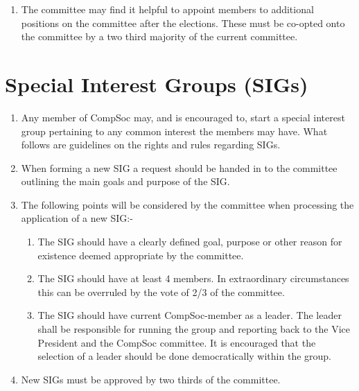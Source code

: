 \documentclass[a4paper]{article}
\begin{document}
\begin {enumerate}
    \item The committee may find it helpful to appoint members to additional positions
      on the committee after the elections. These must be co-opted onto the committee by a two
      third majority of the current committee.

\end{enumerate}


\newpage{}
\section{Special Interest Groups (SIGs)}

\begin{enumerate}

  \item Any member of CompSoc may, and is encouraged to, start a special interest
    group pertaining to any common interest the members may have.
    What follows are guidelines on the rights and rules regarding SIGs.

  \item When forming a new SIG a request should be handed in to the committee
    outlining the main goals and purpose of the SIG.

  \item The following points will be considered by the committee when processing
    the application of a new SIG:-
    \begin{enumerate}
      \item The SIG should have a clearly defined goal, purpose or other reason
      for existence deemed appropriate by the committee.
      \item The SIG should have at least 4 members. In extraordinary circumstances
      this can be overruled by the vote of 2/3 of the committee.
      \item The SIG should have current CompSoc-member as a leader. The
      leader shall be responsible for running the group and reporting back
      to the Vice President and the CompSoc committee. It is encouraged
      that the selection of a leader should be done democratically within the
      group.
    \end{enumerate}

  \item New SIGs must be approved by two thirds of the committee.


\end{enumerate}
\end{document}
